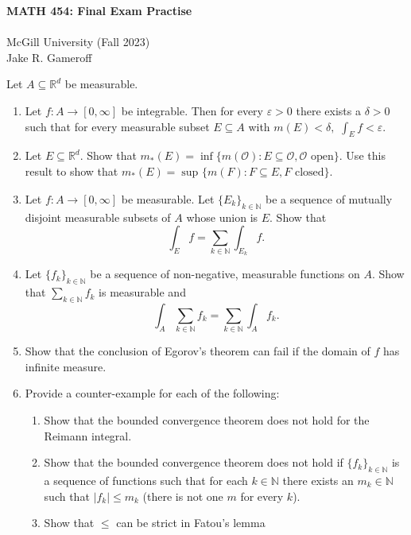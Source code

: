 
\usepackage{todonotes}


\begin{center}
	\textbf{\large MATH 454: Final Exam Practise} \\
    \\ \large McGill University (Fall 2023)
    \\ Jake R. Gameroff 
\end{center}
Let \( A \subseteq \mathbb{R}^{d}  \) be measurable.
\begin{enumerate}
	\item Let \( f : A \to [0, \infty] \) be integrable. Then for every \( \varepsilon > 0  \) there exists a \( \delta > 0  \) such that for every measurable subset \( E \subseteq A \) with \( m(E) < \delta, \) \( \int_{E} f < \varepsilon  \).
	\item Let \( E \subseteq \mathbb{R}^{d}  \). Show that \( m_*(E) = \inf \{ m(\mathcal{O} ) :E \subseteq  \mathcal{O}, \mathcal{O} \mbox{ open}  \}  \). Use this result to show that \( m_*(E) = \sup_{}\{ m(F) : F \subseteq E, F \mbox{ closed} \}   \).
	\item Let \( f : A \to [0,\infty] \) be measurable. Let \( \{ E_{k}  \} _{ k \in \mathbb{N} }  \) be a sequence of mutually disjoint measurable subsets of \( A \) whose union is \( E \). Show that \[\int_{E} f = \sum_{k \in \mathbb{N} }^{}\int_{E_{k} } f.\]
	\item Let \( \{ f_{k}  \} _{k \in \mathbb{N} }  \) be a sequence of non-negative, measurable functions on \( A \). Show that \(\sum_{k \in \mathbb{N} }^{}f_{k} \) is measurable and \[\int_{A} \sum_{k \in \mathbb{N} }^{}f_{k} = \sum_{k \in \mathbb{N} }^{}\int_{A} f_{k}. \] 
	\item Show that the conclusion of Egorov's theorem can fail if the domain of \( f \) has infinite measure.
	\item Provide a counter-example for each of the following:
		\begin{enumerate}
			\item Show that the bounded convergence theorem does not hold for the Reimann integral.
			\item Show that the bounded convergence theorem does not hold if \( \{ f_{k}  \} _{k \in \mathbb{N} }  \) is a sequence of functions such that for each \( k \in \mathbb{N}  \) there exists an \( m_{k} \in \mathbb{N}   \) such that \( |f_{k} | \leq m_{k}  \) (there is not one \( m \) for every \( k \)).
			\item Show that \( \leq \) can be strict in Fatou's lemma

\end{enumerate}
\end{enumerate}
